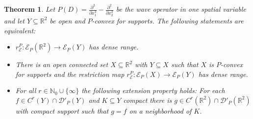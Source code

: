 \documentclass[12pt]{amsart}
\newcommand{\N}{\mathbb{N}}
\newcommand{\R}{\mathbb{R}}
\newtheorem{theorem}{Theorem}[section]
\theoremstyle{definition}
\theoremstyle{remark}
\numberwithin{equation}{section}
\begin{document}
\begin{theorem}\label{theo: Runge for wave operator}
	Let $P(D)=\frac{\partial^2}{\partial x_1^2}-\frac{\partial^2}{\partial x_2^2}$ be the wave operator  in one spatial variable and let $Y\subseteq\R^2$ be open and $P$-convex for supports. The following statements are equivalent:
		\begin{itemize} 
			\item[(i)] $r_{\mathscr{E}}^P:\mathscr{E}_P(\R^2)\rightarrow\mathscr{E}_P(Y)$ has dense range.
			\item[(ii)] There is an open connected set $X \subseteq \R^2$ with $Y \subseteq X$  such that $X$ is $P$-convex for supports and the restriction map $r_{\mathscr{E}}^P:\mathscr{E}_P(X)\rightarrow\mathscr{E}_P(Y)$ has dense range.
			\item[(iii)] For all   $r\in\N_0\cup\{\infty\}$ the following extension property holds:  For each $f \in C^r(Y)\cap\mathscr{D}'_P(Y)$  and $K \subseteq Y$ compact  there is  $g\in C^r(\R^2)\cap\mathscr{D}'_P(\R^2)$ with compact support such that  $g=f$ on a neighborhood of $K$.
		\end{itemize}
\end{theorem}
\end{document}
